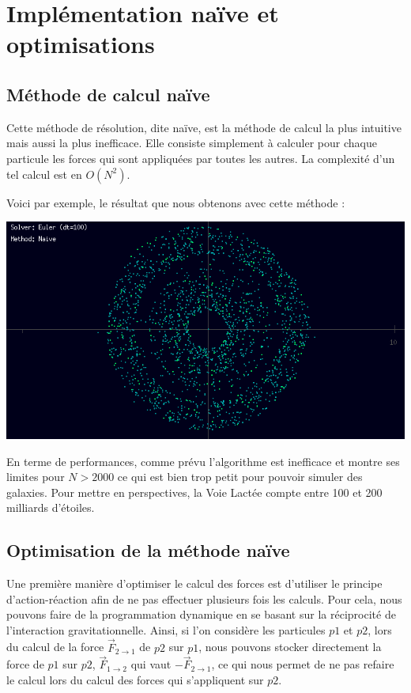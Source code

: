 \chapter{Implémentation naïve et optimisations}

\section{Méthode de calcul naïve}

Cette méthode de résolution, dite naïve, est la méthode de calcul la plus intuitive mais aussi la plus inefficace. Elle consiste simplement à calculer pour chaque particule les forces qui sont appliquées par toutes les autres. La complexité d'un tel calcul est en $O(N^2)$.

Voici par exemple, le résultat que nous obtenons avec cette méthode :

\begin{center}
\includegraphics[scale=0.8]{images/naive.png}
\captionsetup{hypcap=false}
\label{fig2}
\end{center}

En terme de performances, comme prévu l'algorithme est inefficace et montre ses limites pour $N>2000$ ce qui est bien trop petit pour pouvoir simuler des galaxies. Pour mettre en perspectives, la Voie Lactée compte entre 100 et 200 milliards d'étoiles.

\section{Optimisation de la méthode naïve}
\vspace{2mm}

Une première manière d'optimiser le calcul des forces est d'utiliser le principe d'action-réaction afin de ne pas effectuer plusieurs fois les calculs.
Pour cela, nous pouvons faire de la programmation dynamique en se basant sur la réciprocité de l'interaction gravitationnelle. Ainsi, si l'on considère les particules $p1$ et $p2$, lors du calcul de la force $\vec{F}_{2 \rightarrow 1}$ de $p2$ sur $p1$, nous pouvons stocker directement la force de $p1$ sur $p2$, $\vec{F}_{1 \rightarrow 2}$ qui vaut $-\vec{F}_{2 \rightarrow 1}$, ce qui nous permet de ne pas refaire le calcul lors du calcul des forces qui s'appliquent sur $p2$.

